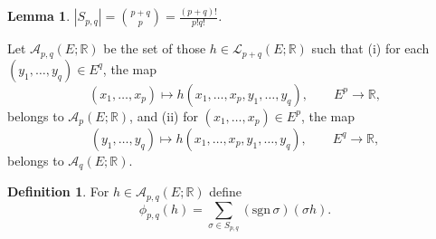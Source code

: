 \documentclass{article}
\newcommand{\sgn}{\mathrm{sgn}\,}
\newtheorem{lemma}[theorem]{Lemma}
\theoremstyle{definition}
\newtheorem{definition}[theorem]{Definition}
\begin{document}
\begin{lemma}
$|S_{p,q}| = \binom{p+q}{p} = \frac{(p+q)!}{p!q!}$.
\end{lemma}

Let $\mathscr{A}_{p,q}(E;\mathbb{R})$ be the set of those
$h \in \mathscr{L}_{p+q}(E;\mathbb{R})$ such that (i) for each $(y_1,\ldots,y_q) \in E^q$, the map
\[
(x_1,\ldots,x_p) \mapsto h(x_1,\ldots,x_p,y_1,\ldots,y_q),\qquad
E^p \to \mathbb{R},
\]
belongs to $\mathscr{A}_p(E;\mathbb{R})$, and (ii)
for $(x_1,\ldots,x_p) \in E^p$, the map
\[
(y_1,\ldots,y_q) \mapsto h(x_1,\ldots,x_p,y_1,\ldots,y_q),
\qquad E^q \to \mathbb{R},
\]
belongs to $\mathscr{A}_q(E;\mathbb{R})$.

\begin{definition}
For $h \in \mathscr{A}_{p,q}(E;\mathbb{R})$ define
\[
\phi_{p,q}(h) = \sum_{\sigma \in S_{p,q}} (\sgn \sigma) (\sigma h).
\]
\end{definition}
\end{document}
